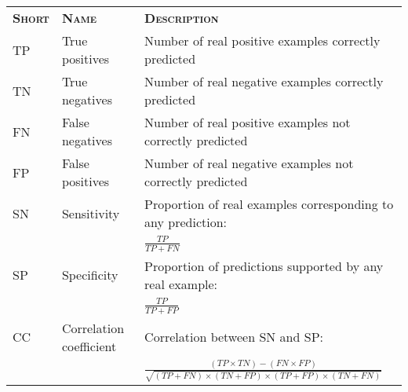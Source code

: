 \documentclass{article}
\begin{document}
\begin{center}

\noindent\begin{minipage}{\linewidth}%
\begin{center}%
\begin{tabular}{>{\scshape}lll}%
\rowcolor[gray]{0.9}
\color{black} \bfseries \scshape Short & \bfseries \scshape Name & \bfseries \scshape Description\\
TP & True positives & Number of real positive examples correctly predicted\\
TN & True negatives & Number of real negative examples correctly predicted\\
FN & False negatives & Number of real positive examples not correctly predicted\\
FP & False positives & Number of real negative examples not correctly predicted\\
SN & Sensitivity & Proportion of real examples corresponding to any prediction:\\[1.5ex]
   &             & $\frac{TP}{TP+FN}$\\[1.5ex]
SP & Specificity & Proportion of predictions supported by any real example:\\[1.5ex]
   &             & $\frac{TP}{TP+FP}$\\[1.5ex]
CC & Correlation coefficient & Correlation between SN and SP:\\[1.5ex]
   &                         & $\frac{(TP \times TN) - (FN \times FP)}{\sqrt{(TP+FN) \times (TN+FP) \times (TP+FP) \times (TN + FN)}}$\\
\end{tabular}%
\end{center}%
\end{minipage}%

\end{center}%
\end{document}
